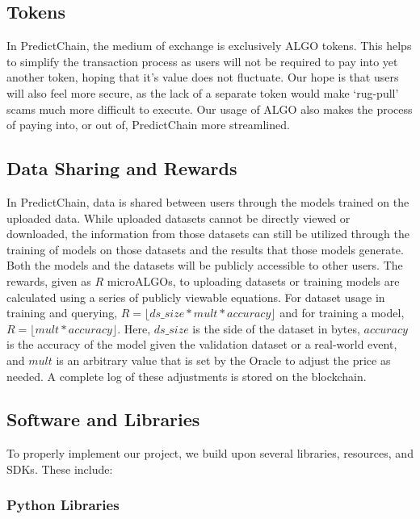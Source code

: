 \documentclass{ledger}
\begin{document}
\subsection{Tokens}

In PredictChain, the medium of exchange is exclusively ALGO tokens.  This helps to simplify the transaction process as
users will not be required to pay into yet another token, hoping that it's value does not fluctuate.  Our hope is that
users will also feel more secure, as the lack of a separate token would make `rug-pull' scams much more difficult to
execute. Our usage of ALGO also makes the process of paying into, or out of, PredictChain more streamlined.

\subsection{Data Sharing and Rewards}

In PredictChain, data is shared between users through the models trained on the uploaded data.  While uploaded datasets
cannot be directly viewed or downloaded, the information from those datasets can still be utilized through the training
of models on those datasets and the results that those models generate.  Both the models and the datasets will be publicly
accessible to other users.  The rewards, given as $R$ microALGOs, to uploading datasets or training models are calculated
using a series of publicly viewable equations.  For dataset usage in training and querying, $R = \lfloor ds\_size * mult * accuracy \rfloor$
and for training a model, $R = \lfloor mult * accuracy \rfloor$.  Here, $ds\_size$ is the side of the dataset in bytes,
$accuracy$ is the accuracy of the model given the validation dataset or a real-world event, and $mult$ is an arbitrary value
that is set by the Oracle to adjust the price as needed.  A complete log of these adjustments is stored on the blockchain.

\subsection{Software and Libraries}

To properly implement our project, we build upon several libraries, resources, and SDKs.  These include:

\subsubsection{Python Libraries}
\end{document}
